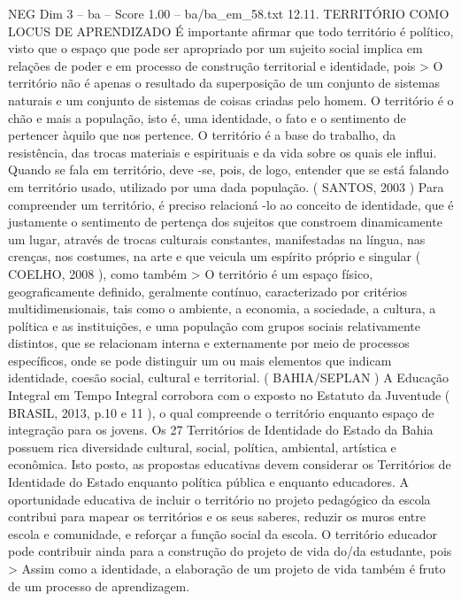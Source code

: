 \begin{textsample}{NEG Dim 3 – ba – Score 1.00 – ba/ba\_em\_58.txt}  \label{ex:f3_neg_119}
12.11.
TERRITÓRIO COMO LOCUS DE APRENDIZADO É importante afirmar que todo território é político, visto que o espaço que pode ser apropriado por um sujeito social implica em relações de poder e em processo de construção territorial e identidade, pois > O território não é apenas o resultado da superposição de um conjunto de sistemas naturais e um conjunto de sistemas de coisas criadas pelo homem.
O território é o chão e mais a população, isto é, uma identidade, o fato e o sentimento de pertencer àquilo que nos pertence.
O território é a base do trabalho, da resistência, das trocas materiais e espirituais e da vida sobre os quais ele influi.
Quando se fala em território, deve -se, pois, de logo, entender que se está falando em território usado, utilizado por uma dada população. ( SANTOS, 2003 ) Para compreender um território, é preciso relacioná -lo ao conceito de identidade, que é justamente o sentimento de pertença dos sujeitos que constroem dinamicamente um lugar, através de trocas culturais constantes, manifestadas na língua, nas crenças, nos costumes, na arte e que veicula um espírito próprio e singular ( COELHO, 2008 ), como também > O território é um espaço físico, geograficamente definido, geralmente contínuo, caracterizado por critérios multidimensionais, tais como o ambiente, a economia, a sociedade, a cultura, a política e as instituições, e uma população com grupos sociais relativamente distintos, que se relacionam interna e externamente por meio de processos específicos, onde se pode distinguir um ou mais elementos que indicam identidade, coesão social, cultural e territorial. ( BAHIA/SEPLAN ) A Educação Integral em Tempo Integral corrobora com o exposto no Estatuto da Juventude ( BRASIL, 2013, p.10 e 11 ), o qual compreende o território enquanto espaço de integração para os jovens.
Os 27 Territórios de Identidade do Estado da Bahia possuem rica diversidade cultural, social, política, ambiental, artística e econômica.
Isto posto, as propostas educativas devem considerar os Territórios de Identidade do Estado enquanto política pública e enquanto educadores.
A oportunidade educativa de incluir o território no projeto pedagógico da escola contribui para mapear os territórios e os seus saberes, reduzir os muros entre escola e comunidade, e reforçar a função social da escola.
O território educador pode contribuir ainda para a construção do projeto de vida do/da estudante, pois > Assim como a identidade, a elaboração de um projeto de vida também é fruto de um processo de aprendizagem.

\end{textsample}
